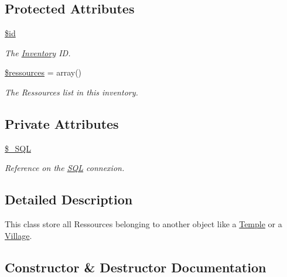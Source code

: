 \subsection*{Protected Attributes}
\begin{DoxyCompactItemize}
\item 
\mbox{\label{classInventory_a938439393bff41626879c81b27fa3eb1}} 
\mbox{\hyperlink{classInventory_a938439393bff41626879c81b27fa3eb1}{\$id}}
\begin{DoxyCompactList}\small\item\em The \mbox{\hyperlink{classInventory}{Inventory}} ID. \end{DoxyCompactList}\item 
\mbox{\label{classInventory_ae2de638a5d5b2175cea1327dd6a1097d}} 
\mbox{\hyperlink{classInventory_ae2de638a5d5b2175cea1327dd6a1097d}{\$ressources}} = array()
\begin{DoxyCompactList}\small\item\em The Ressources list in this inventory. \end{DoxyCompactList}\end{DoxyCompactItemize}
\subsection*{Private Attributes}
\begin{DoxyCompactItemize}
\item 
\mbox{\label{classInventory_a7097eb9666f0d9e70ef7d0b1ef770cb5}} 
\mbox{\hyperlink{classInventory_a7097eb9666f0d9e70ef7d0b1ef770cb5}{\$\+\_\+\+S\+QL}}
\begin{DoxyCompactList}\small\item\em Reference on the \mbox{\hyperlink{classSQL}{S\+QL}} connexion. \end{DoxyCompactList}\end{DoxyCompactItemize}


\subsection{Detailed Description}
This class store all Ressources belonging to another object like a \mbox{\hyperlink{classTemple}{Temple}} or a \mbox{\hyperlink{classVillage}{Village}}. 

\subsection{Constructor \& Destructor Documentation}
\mbox{\label{classInventory_ad590054ec1e295007c7a7f14ecd12ac5}} 
